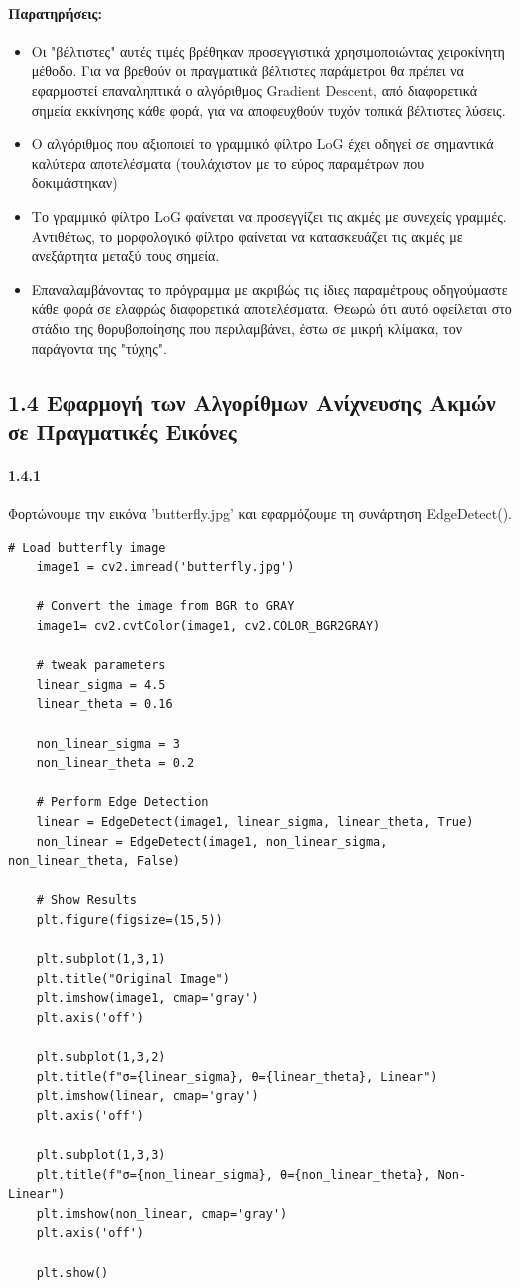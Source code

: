 \documentclass[]{article}
\begin{document}
	\paragraph{Παρατηρήσεις: }
	\begin{itemize}
		\item Οι "βέλτιστες" αυτές τιμές βρέθηκαν προσεγγιστικά χρησιμοποιώντας χειροκίνητη μέθοδο. Για να βρεθούν οι πραγματικά βέλτιστες παράμετροι θα πρέπει να εφαρμοστεί επαναληπτικά ο αλγόριθμος Gradient Descent, από διαφορετικά σημεία εκκίνησης κάθε φορά, για να αποφευχθούν τυχόν τοπικά βέλτιστες λύσεις.
		\item Ο αλγόριθμος που αξιοποιεί το γραμμικό φίλτρο LoG έχει οδηγεί σε σημαντικά καλύτερα αποτελέσματα (τουλάχιστον με το εύρος παραμέτρων που δοκιμάστηκαν)
		\item Το γραμμικό φίλτρο LoG φαίνεται να προσεγγίζει τις ακμές με συνεχείς γραμμές. Αντιθέτως, το μορφολογικό φίλτρο φαίνεται να κατασκευάζει τις ακμές με ανεξάρτητα μεταξύ τους σημεία.
		\item Επαναλαμβάνοντας το πρόγραμμα με ακριβώς τις ίδιες παραμέτρους οδηγούμαστε κάθε φορά σε ελαφρώς διαφορετικά αποτελέσματα. Θεωρώ ότι αυτό οφείλεται στο στάδιο της θορυβοποίησης που περιλαμβάνει, έστω σε μικρή κλίμακα, τον παράγοντα της "τύχης".
	\end{itemize}
	\subsection*{1.4 Εφαρμογή των Αλγορίθμων Ανίχνευσης Ακμών σε Πραγματικές Εικόνες}	
	\paragraph{1.4.1} Φορτώνουμε την εικόνα 'butterfly.jpg' και εφαρμόζουμε τη συνάρτηση EdgeDetect().
	\begin{lstlisting}[caption={load butterfly.jpg and apply EdgeDetect()}]
	# Load butterfly image
	image1 = cv2.imread('butterfly.jpg')
	
	# Convert the image from BGR to GRAY
	image1= cv2.cvtColor(image1, cv2.COLOR_BGR2GRAY)
	
	# tweak parameters
	linear_sigma = 4.5
	linear_theta = 0.16
	
	non_linear_sigma = 3
	non_linear_theta = 0.2
	
	# Perform Edge Detection
	linear = EdgeDetect(image1, linear_sigma, linear_theta, True)
	non_linear = EdgeDetect(image1, non_linear_sigma, non_linear_theta, False)
	
	# Show Results
	plt.figure(figsize=(15,5))
	
	plt.subplot(1,3,1)
	plt.title("Original Image")
	plt.imshow(image1, cmap='gray')
	plt.axis('off')
	
	plt.subplot(1,3,2)
	plt.title(f"σ={linear_sigma}, θ={linear_theta}, Linear")
	plt.imshow(linear, cmap='gray')
	plt.axis('off')
	
	plt.subplot(1,3,3)
	plt.title(f"σ={non_linear_sigma}, θ={non_linear_theta}, Non-Linear")
	plt.imshow(non_linear, cmap='gray')
	plt.axis('off')
	
	plt.show()
	\end{lstlisting}
\end{document}
